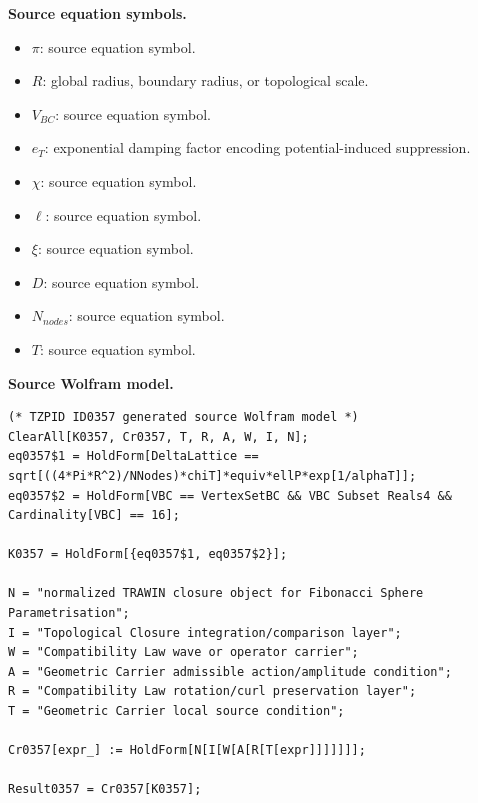 \begin{minipage}[t]{0.49\linewidth}
\begingroup
\small
\raggedright
\textbf{Source equation symbols.}\par
\begin{itemize}[leftmargin=1.35em,itemsep=1pt,topsep=1pt,parsep=0pt]
    \item $\pi$: source equation symbol.
    \item $R$: global radius, boundary radius, or topological scale.
    \item $V_{BC}$: source equation symbol.
    \item $e_T$: exponential damping factor encoding potential-induced suppression.
    \item $\chi$: source equation symbol.
    \item $\ell$: source equation symbol.
    \item $\xi$: source equation symbol.
    \item $D$: source equation symbol.
    \item $N_{nodes}$: source equation symbol.
    \item $T$: source equation symbol.
\end{itemize}
\endgroup
\end{minipage}\hfill
\begin{minipage}[t]{0.47\linewidth}
\begingroup
\scriptsize
\raggedright
\textbf{Source Wolfram model.}\par
\begin{Verbatim}[fontsize=\tiny,breaklines=true,breakanywhere=true]
(* TZPID ID0357 generated source Wolfram model *)
ClearAll[K0357, Cr0357, T, R, A, W, I, N];
eq0357$1 = HoldForm[DeltaLattice == sqrt[((4*Pi*R^2)/NNodes)*chiT]*equiv*ellP*exp[1/alphaT]];
eq0357$2 = HoldForm[VBC == VertexSetBC && VBC Subset Reals4 && Cardinality[VBC] == 16];

K0357 = HoldForm[{eq0357$1, eq0357$2}];

N = "normalized TRAWIN closure object for Fibonacci Sphere Parametrisation";
I = "Topological Closure integration/comparison layer";
W = "Compatibility Law wave or operator carrier";
A = "Geometric Carrier admissible action/amplitude condition";
R = "Compatibility Law rotation/curl preservation layer";
T = "Geometric Carrier local source condition";

Cr0357[expr_] := HoldForm[N[I[W[A[R[T[expr]]]]]]];

Result0357 = Cr0357[K0357];
\end{Verbatim}
\endgroup
\end{minipage}

